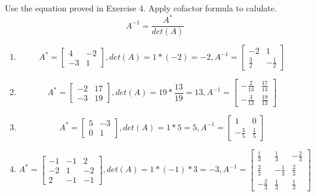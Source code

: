 \documentclass{article}
\begin{document}
Use the equation proved in Exercise 4. Apply cofactor formula to calulate.
\[
A^{-1}=\frac{A^*}{det(A)}
\]
\begin{enumerate}
    \item \[
    A^*=\begin{bmatrix}
        4 & -2 \\
        -3 & 1
    \end{bmatrix} , det(A) = 1*(-2)=-2 , A^{-1}=\begin{bmatrix}
        -2 & 1\\
        \frac{3}{2} & -\frac{1}{2}
    \end{bmatrix}
    \]
    \item \[
        A^*=\begin{bmatrix}
            -2 & 17 \\
            -3 & 19
        \end{bmatrix}
        ,
        det(A)=19*\frac{13}{19}=13 , 
        A^{-1}=\begin{bmatrix}
            -\frac{2}{13} & \frac{17}{13}\\
            -\frac{3}{13} & \frac{19}{13}
        \end{bmatrix}
    \]
    \item \[
        A^*=\begin{bmatrix}
            5 & -3 \\
            0 & 1
        \end{bmatrix}
        ,
        det(A)=1*5=5 , 
        A^{-1}=\begin{bmatrix}
            1 & 0 \\
            -\frac{3}{5}& \frac{1}{5}
        \end{bmatrix}
    \]
    \item \[
        A^*=\begin{bmatrix}
            -1 & -1 & 2 \\
            -2 & 1 & -2 \\                                               
            2 & -1 & -1
        \end{bmatrix}
        ,
        det(A)=1*(-1)*3=-3, 
        A^{-1}=\begin{bmatrix}
            \frac{1}{3} & \frac{1}{3} & -\frac{2}{3}\\
            \frac{2}{3} & -\frac{1}{3} & \frac{2}{3}\\
            -\frac{2}{3} & \frac{1}{3} & \frac{1}{3}
        \end{bmatrix}
    \]
\end{enumerate}
\end{document}
